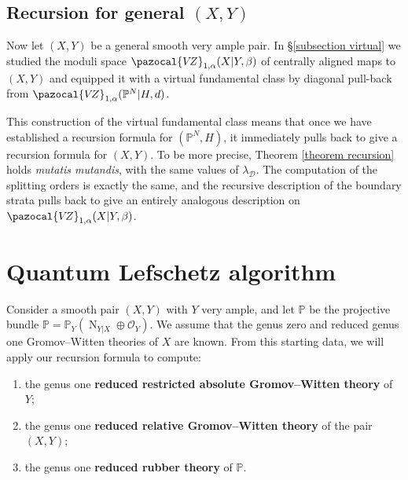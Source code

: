 \documentclass[11pt]{amsart}
\newcommand{\PP}{\mathbb P}
\newcommand{\VZ}{\pazocal{V\!Z}}
\newcommand{\OO}{\mathcal{O}}
\newcommand{\Dcal}{\mathcal{D}}
\theoremstyle{definition}
\theoremstyle{definition}
\begin{document}
\subsection{Recursion for general $(X,Y)$}\label{section recursion for general pair} Now let $(X,Y)$ be a general smooth very ample pair. In \S \ref{subsection virtual} we studied the moduli space $\VZ_{1,\alpha}(X|Y,\beta)$ of centrally aligned maps to $(X,Y)$ and equipped it with a virtual fundamental class by diagonal pull-back from $\VZ_{1,\alpha}(\PP^N|H,d)$.

This construction of the virtual fundamental class means that once we have established a recursion formula for $(\PP^N,H)$, it immediately pulls back to give a recursion formula for $(X,Y)$. To be more precise, Theorem \ref{theorem recursion} holds \emph{mutatis mutandis}, with the same values of $\lambda_\Dcal$. The computation of the splitting orders is exactly the same, and the recursive description of the boundary strata pulls back to give an entirely analogous description on $\VZ_{1,\alpha}(X|Y,\beta)$.


\section{Quantum Lefschetz algorithm}\label{section recursion algorithm}
Consider a smooth pair $(X,Y)$ with $Y$ very ample, and let $\mathbb{P}$ be the projective bundle $\mathbb{P}=\PP_Y(\operatorname{N}_{Y|X} \oplus\OO_Y)$. We assume that the genus zero and reduced genus one Gromov--Witten theories of $X$ are known. From this starting data, we will apply our recursion formula to compute:
 \begin{enumerate} 
\item the genus one \textbf{reduced restricted absolute Gromov--Witten theory} of $Y$;
\item the genus one \textbf{reduced relative Gromov--Witten theory} of the pair $(X,Y)$;
\item the genus one \textbf{reduced rubber theory} of $\mathbb{P}$.
 \end{enumerate} 
\end{document}
